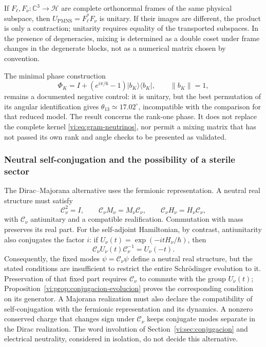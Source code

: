 If \(F_\ell,F_\nu:\mathbb C^3\to\mathcal H\) are complete orthonormal
frames of the same physical subspace, then
\(U_{\mathrm{PMNS}}=F_\ell^*F_\nu\) is unitary. If their images are
different, the product is only a contraction; unitarity requires
equality of the transported subspaces. In the presence of degeneracies,
mixing is determined as a double coset under frame changes in
the degenerate blocks, not as a numerical matrix chosen by convention.

The minimal phase construction
\[
 \Phi_K=I+(e^{i\pi/6}-1)|b_K\rangle\langle b_K|,
 \qquad\|b_K\|=1,
\]
remains a documented negative control: it is unitary, but the best
permutation of its angular identification gives
\(\theta_{13}\simeq17.02^\circ\), incompatible with the comparison for that
reduced model. The result concerns the rank-one phase. It does not
replace the complete kernel \eqref{vi:eq:gram-neutrinos}, nor permit a mixing
matrix that has not passed its own rank and angle checks
to be presented as validated.

\subsubsection{Neutral self-conjugation and the possibility of a sterile sector}

The Dirac--Majorana alternative uses the fermionic representation. A
neutral real structure must satisfy
\[
 \mathcal C_\nu^2=I,\qquad
 \mathcal C_\nu M_\nu=M_\nu\mathcal C_\nu,\qquad
 \mathcal C_\nu H_\nu=H_\nu\mathcal C_\nu,
\]
with \(\mathcal C_\nu\) antiunitary and a compatible realification.
Commutation with mass preserves its real part. For the self-adjoint
Hamiltonian, by contrast, antiunitarity also conjugates the factor
\(i\): if \(U_\nu(t)=\exp(-itH_\nu/\hbar)\), then
\[
 \mathcal C_\nu U_\nu(t)\mathcal C_\nu^{-1}=U_\nu(-t).
\]
Consequently, the fixed modes \(\psi=\mathcal C_\nu\psi\) define a
neutral real structure, but the stated conditions are insufficient to
restrict the entire Schr\"odinger evolution to it. Preservation of
that fixed part requires \(\mathcal C_\nu\) to commute with the group
\(U_\nu(t)\); Proposition~\ref{vi:prop:conjugacion-evolucion}
proves the corresponding condition on its generator. A
Majorana realization must also declare the compatibility of
self-conjugation with the fermionic representation and its dynamics.
A nonzero conserved charge that changes
sign under \(\mathcal C_\nu\) keeps conjugate modes separate
in the Dirac realization. The word involution of
Section~\ref{vi:sec:conjugacion} and electrical neutrality, considered
in isolation, do not decide this alternative.

